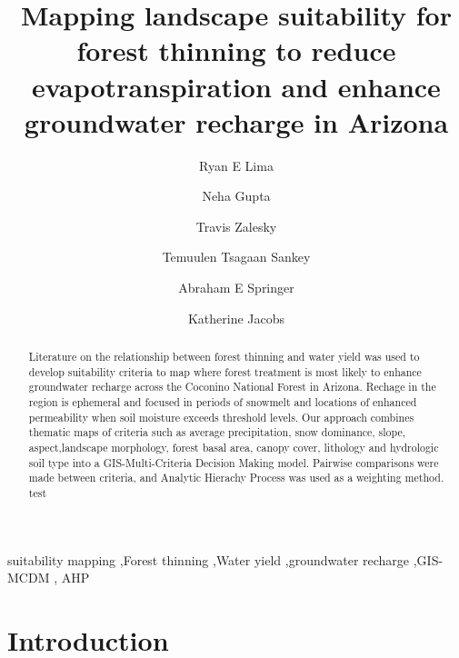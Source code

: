 \documentclass[
  number,
  preprint,
  3p,
  onecolumn]{elsarticle}
\begin{document}
\begin{frontmatter}
\title{Mapping landscape suitability for forest thinning to reduce
evapotranspiration and enhance groundwater recharge in Arizona}
\author[1]{Ryan E Lima%
%
}
\author[2]{Neha Gupta%
%
}

\author[2]{Travis Zalesky%
%
}

\author[1]{Temuulen Tsagaan Sankey%
%
}

\author[1]{Abraham E Springer%
%
}

\author[2]{Katherine Jacobs%
%
}









        
\begin{abstract}
Literature on the relationship between forest thinning and water yield
was used to develop suitability criteria to map where forest treatment
is most likely to enhance groundwater recharge across the Coconino
National Forest in Arizona. Rechage in the region is ephemeral and
focused in periods of snowmelt and locations of enhanced permeability
when soil moisture exceeds threshold levels. Our approach combines
thematic maps of criteria such as average precipitation, snow dominance,
slope, aspect,landscape morphology, forest basal area, canopy cover,
lithology and hydrologic soil type into a GIS-Multi-Criteria Decision
Making model. Pairwise comparisons were made between criteria, and
Analytic Hierachy Process was used as a weighting method. test
\end{abstract}





\begin{keyword}
    suitability mapping \sep Forest thinning \sep Water
yield \sep groundwater recharge \sep GIS-MCDM \sep 
    AHP
\end{keyword}
\end{frontmatter}
    

\section{Introduction}\label{sec-intro}
\end{document}
